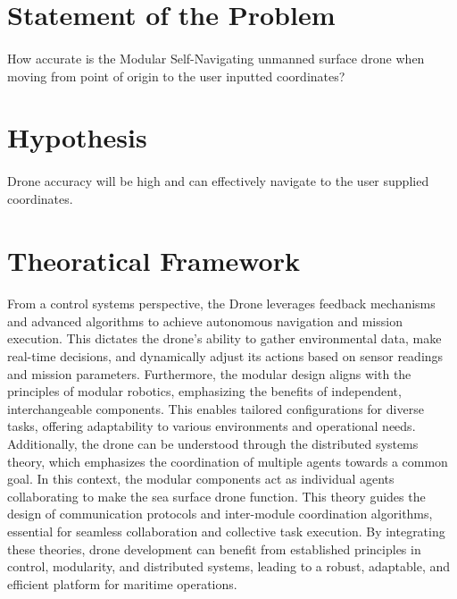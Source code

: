 \section{Statement of the Problem}
\paragraph{} How accurate is the Modular Self-Navigating unmanned surface drone when moving from point of origin to the user inputted coordinates?

\section{Hypothesis}
\paragraph{} Drone accuracy will be high and can effectively navigate to the user supplied coordinates.

\section{Theoratical Framework}
\paragraph{} From a control systems perspective, the Drone leverages feedback mechanisms and advanced algorithms to achieve autonomous navigation and 
            mission execution. This dictates the drone's ability to gather environmental data, make real-time decisions, and dynamically adjust its 
            actions based on sensor readings and mission parameters. Furthermore, the modular design aligns with the principles of modular robotics, 
            emphasizing the benefits of independent, interchangeable components. This enables tailored configurations for diverse tasks, offering 
            adaptability to various environments and operational needs. Additionally, the drone can be understood through the distributed systems theory, 
            which emphasizes the coordination of multiple agents towards a common goal. In this context, the modular components act as individual agents 
            collaborating to make the sea surface drone function. This theory guides the design of communication protocols and inter-module coordination 
            algorithms, essential for seamless collaboration and collective task execution. By integrating these theories, drone development can benefit 
            from established principles in control, modularity, and distributed systems, leading to a robust, adaptable, and efficient platform for maritime 
            operations.

